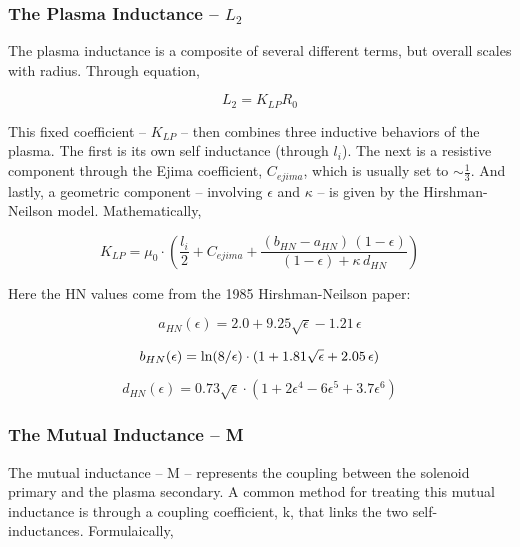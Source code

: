 \subsubsection{The Plasma Inductance -- $L_2$}

The plasma inductance is a composite of several different terms, but overall scales with radius. Through equation,

\begin{equation}
	L_2 = K_{LP} R_0
\end{equation}

This fixed coefficient -- $K_{LP}$ -- then combines three inductive behaviors of the plasma. The first is its own self inductance (through $l_i$). \cite{jeff} The next is a resistive component through the Ejima coefficient, $C_{ejima}$, which is usually set to $\sim \frac{1}{3}$. \cite{process} And lastly, a geometric component -- involving $\epsilon$ and $\kappa$ -- is given by the Hirshman-Neilson model. \cite{hn85} Mathematically,

\begin{equation}
	K_{LP} = \mu_0 \cdot \left( \frac{l_i}{2} + C_{ejima} + \frac{ ( b_{HN} - a_{HN} ) \, ( 1 - \epsilon ) }{ ( 1 - \epsilon ) + \kappa \, d_{HN} } \right)
\end{equation}

Here the HN values come from the 1985 Hirshman-Neilson paper:

\begin{equation}
	a_{HN}(\epsilon) = 2.0 + 9.25 \sqrt{\epsilon} - 1.21 \, \epsilon
\end{equation}

\begin{equation}
	b_{HN}(\epsilon) = \textnormal{ln} (8/\epsilon) \cdot ( 1 + 1.81 \sqrt{\epsilon} + 2.05 \, \epsilon )
\end{equation}

\begin{equation}
	d_{HN}(\epsilon) = 0.73 \sqrt{\epsilon}  \cdot ( 1 + 2 \epsilon^4 - 6 \epsilon^5 +3.7 \epsilon^6 )
\end{equation}

\subsubsection{The Mutual Inductance -- M}

The mutual inductance -- M -- represents the coupling between the solenoid primary and the plasma secondary. A common method for treating this mutual inductance is through a coupling coefficient, k, that links the two self-inductances. Formulaically, 

